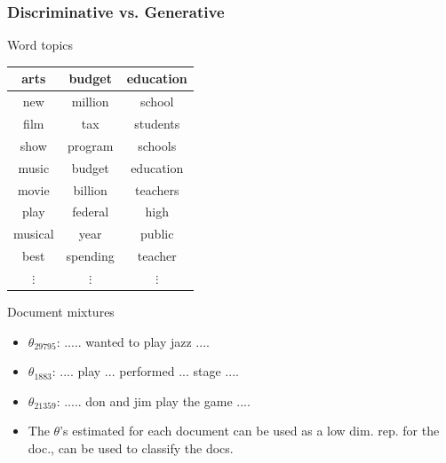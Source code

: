 \documentclass[10pt, svgnames]{beamer}
\begin{document}
\begin{frame}
\frametitle{Discriminative vs. Generative}
\begin{minipage}{0.5\linewidth}
\begin{center}
Word topics
\end{center}
\begin{center}
\footnotesize{
\begin{tabular}{|c|c|c|}
\hline
arts & budget & education\\
\hline
\hline
new & million & school\\
film & tax & students\\
show & program & schools\\
music & budget & education\\
movie & billion & teachers\\
play & federal & high \\
musical & year & public \\
best & spending & teacher\\
$\vdots$ & $\vdots$ & $\vdots$\\
\hline
\end{tabular}
}
\end{center}
\end{minipage}
\hfill
\begin{minipage}{0.45\linewidth}
\begin{center}
Document mixtures
\end{center}
\footnotesize{
\begin{itemize}
\item $\theta_{29795}$: ..... wanted to play jazz ....
\item $\theta_{1883}$: .... play ... performed ... stage ....
\item $\theta_{21359}$: ..... don and jim play the game ....
\item The $\theta$'s estimated for each document can be used as a low dim. rep. for the doc., can be used to classify the docs.
\end{itemize}
}
\end{minipage}
\end{frame}
\end{document}
